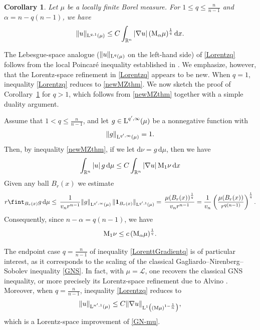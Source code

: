 \documentclass[11pt, a4paper, reqno]{amsart}
\newcommand{\R}{\mathbb R}
\newcommand{\al}{\alpha}
\newcommand{\dx}{\,{\mathrm dx}}
\newcommand{\dmu}{\,{\mathrm d\mu}}
\newcommand{\Lup}{\textup{L}}
\newtheorem{corollary}[theorem]{Corollary}
\theoremstyle{definition}
\theoremstyle{remark}
\begin{document}
\begin{corollary}\label{LorenttGradientq}
Let $\mu$ be a locally finite Borel measure. For $1 \le q \le \frac{n}{n-1}$ and
$\alpha = n - q(n-1)$, we have
\begin{equation}\label{Lorentzq}
\|u\|_{\Lup^{q,1}(\mu)} \le C \int_{\R^n} |\nabla u|\, (\textup{M}_\alpha \mu)^{\frac1q}\dx.
\end{equation}
\end{corollary}
The Lebesgue-space analogue ($\|u\|_{\Lup^q(\mu)}$ on the left-hand side) of \eqref{Lorentzq} follows from the local Poincar\'e inequality established in \cite{MPW}.  We emphasize, however, that the Lorentz-space refinement in \eqref{Lorentzq} appears to be new.  When $q=1$, inequality \eqref{Lorentzq} reduces to \eqref{newMZthm}.  
We now sketch the proof of {Corollary}~\ref{LorenttGradientq}  for $q>1$, which follows from \eqref{newMZthm} together with a simple duality argument.

Assume that $1 < q \le \frac{n}{n-1}$, and let $g \in \Lup^{q',\infty}(\mu)$ be a nonnegative function with
\[
\|g\|_{\Lup^{q',\infty}(\mu)} = 1.
\]
Then, by inequality \eqref{newMZthm}, if we let $\mathrm d\nu=g\dmu$, then we have
\[
\int_{\R^n} |u|\, g \dmu
\le C \int_{\R^n} |\nabla u|\, \textup{M}_1 \nu\dx
\]
Given any ball $B_r(x)$ we estimate
\[
r \fint_{B_r(x)} g \dmu
\le \, \frac{1}{v_nr^{n-1}}
\|g\|_{\Lup^{q',\infty}(\mu)} \,
\|\mathbf 1_{B_r(x)}\|_{\Lup^{q',1}(\mu)}
= \, \frac{\mu(B_r(x))^{\frac{1}{q}}}{v_nr^{n-1}}
= \frac{1}{v_n}\left(\frac{\mu(B_r(x))}{r^{q(n-1)}}\right)^{\frac{1}{q}}.
\]
Consequently, since $n-\al=q(n-1)$, we have
\[
\textup{M}_1 \nu
\le c\, (\textup{M}_\al \mu)^{\frac{1}{q}}.
\]



The endpoint case $q=\frac{n}{n-1}$ of inequality \eqref{LorenttGradientq} is of particular interest, as it corresponds to the scaling of the classical Gagliardo--Nirenberg--Sobolev inequality \eqref{GNS}. In fact, with $\mu=\mathcal L$, one recovers the classical GNS inequality, or more precisely its Lorentz-space refinement due to Alvino \cite{Al}. Moreover, when $q=\frac{n}{n-1}$, inequality \eqref{Lorentzq} reduces to
\begin{equation}\label{GNSmeasure}
\|u\|_{\Lup^{n',1}(\mu)}
\le C \|\nabla u\|_{\Lup^1\bigl((\textup{M}\mu)^{1-\frac1n}\bigr)},
\end{equation}
which is a Lorentz-space improvement of \eqref{GN-mu}. 
\end{document}
